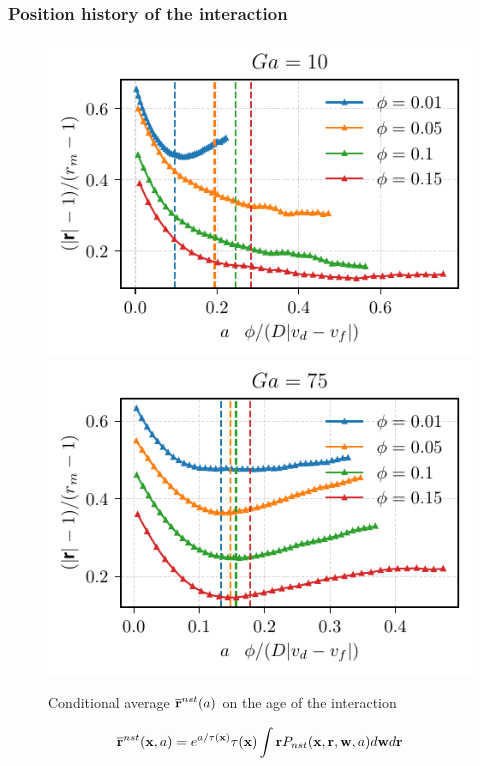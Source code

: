 \documentclass{sintefbeamer}
\begin{document}
\begin{frame}
  \frametitle{Position history of the interaction}
    \begin{figure}
        \includegraphics[height=0.23\textwidth]{image/HOMOGENEOUS/fDrop/r_a_Ga_10.pdf}
        \includegraphics[height=0.23\textwidth]{image/HOMOGENEOUS/fDrop/r_a_Ga_75.pdf}
        \caption{ Conditional average $\overline{\textbf{r}}^{nst}(a)$ on the age of the interaction} 
    \end{figure}
  \begin{equation*}
     \overline{\textbf{r}}^{nst}(\textbf{x},a)
    = e^{a/\tau(\textbf{x})}\tau(\textbf{x})\int \textbf{r} P_{nst}(\textbf{x},\textbf{r},\textbf{w},a) d\textbf{w}d\textbf{r}
  \end{equation*}

\end{frame}
\end{document}
